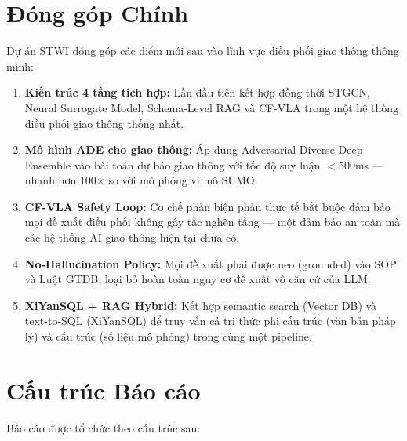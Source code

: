 \section{Đóng góp Chính}

Dự án STWI đóng góp các điểm mới sau vào lĩnh vực điều phối giao thông thông minh:

\begin{enumerate}[leftmargin=1.5cm, itemsep=5pt]
  \item \textbf{Kiến trúc 4 tầng tích hợp:} Lần đầu tiên kết hợp đồng thời STGCN, Neural Surrogate Model, Schema-Level RAG và CF-VLA trong một hệ thống điều phối giao thông thống nhất.

  \item \textbf{Mô hình ADE cho giao thông:} Áp dụng Adversarial Diverse Deep Ensemble vào bài toán dự báo giao thông với tốc độ suy luận $< 500$ms --- nhanh hơn 100$\times$ so với mô phỏng vi mô SUMO.

  \item \textbf{CF-VLA Safety Loop:} Cơ chế phản biện phản thực tế bắt buộc đảm bảo mọi đề xuất điều phối không gây tắc nghẽn tầng --- một đảm bảo an toàn mà các hệ thống AI giao thông hiện tại chưa có.

  \item \textbf{No-Hallucination Policy:} Mọi đề xuất phải được neo (grounded) vào SOP và Luật GTĐB, loại bỏ hoàn toàn nguy cơ đề xuất vô căn cứ của LLM.

  \item \textbf{XiYanSQL + RAG Hybrid:} Kết hợp semantic search (Vector DB) và text-to-SQL (XiYanSQL) để truy vấn cả tri thức phi cấu trúc (văn bản pháp lý) và cấu trúc (số liệu mô phỏng) trong cùng một pipeline.
\end{enumerate}

\section{Cấu trúc Báo cáo}

Báo cáo được tổ chức theo cấu trúc sau:

